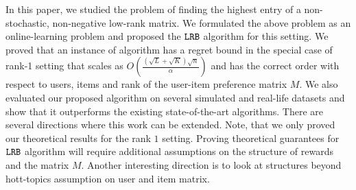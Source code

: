In this paper, we studied the problem of finding the highest entry of a non-stochastic, non-negative low-rank matrix. We formulated the above problem as an online-learning problem and proposed the ${\tt LRB}$ algorithm for this setting. We proved that an instance of algorithm has a regret bound in the special case of rank-1 setting that scales as $O\left(\frac{\left(\sqrt{L } + \sqrt{K }\right) \sqrt{n}}{\alpha}\right)$ and has the correct order with respect to users, items and rank of the user-item preference matrix $M$. We also evaluated our proposed algorithm on several simulated and real-life datasets and show that it outperforms the existing state-of-the-art algorithms. There are several directions where this work can be extended. Note, that we only proved our theoretical results for the rank $1$ setting. Proving theoretical guarantees for ${\tt LRB}$ algorithm will require additional assumptions on the structure of rewards and the matrix $M$. Another interesting direction is to look at structures beyond hott-topics assumption on user and item matrix.

